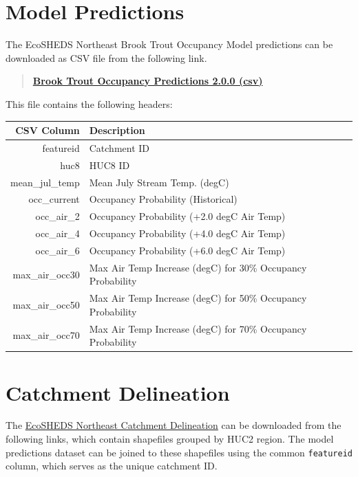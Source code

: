 \documentclass[
]{book}
\begin{document}
\hypertarget{model-predictions}{%
\section{Model Predictions}\label{model-predictions}}

The EcoSHEDS Northeast Brook Trout Occupancy Model predictions can be downloaded as CSV file from the following link.

\begin{quote}
\textbf{\href{output/ecosheds-bto-model-v2.0.0.csv}{Brook Trout Occupancy Predictions 2.0.0 (csv)}}
\end{quote}

This file contains the following headers:

\begin{tabular}{r|l}
\hline
CSV Column & Description\\
\hline
featureid & Catchment ID\\
\hline
huc8 & HUC8 ID\\
\hline
mean\_jul\_temp & Mean July Stream Temp. (degC)\\
\hline
occ\_current & Occupancy Probability (Historical)\\
\hline
occ\_air\_2 & Occupancy Probability (+2.0 degC Air Temp)\\
\hline
occ\_air\_4 & Occupancy Probability (+4.0 degC Air Temp)\\
\hline
occ\_air\_6 & Occupancy Probability (+6.0 degC Air Temp)\\
\hline
max\_air\_occ30 & Max Air Temp Increase (degC) for 30\% Occupancy Probability\\
\hline
max\_air\_occ50 & Max Air Temp Increase (degC) for 50\% Occupancy Probability\\
\hline
max\_air\_occ70 & Max Air Temp Increase (degC) for 70\% Occupancy Probability\\
\hline
\end{tabular}

\hypertarget{catchment-delineation-1}{%
\section{Catchment Delineation}\label{catchment-delineation-1}}

The \href{http://conte-ecology.github.io/shedsGisData/}{EcoSHEDS Northeast Catchment Delineation} can be downloaded from the following links, which contain shapefiles grouped by HUC2 region. The model predictions dataset can be joined to these shapefiles using the common \texttt{featureid} column, which serves as the unique catchment ID.
\end{document}
